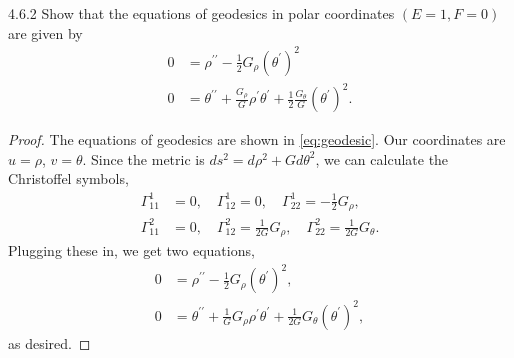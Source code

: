 \documentclass[11pt]{article}
\begin{document}
\begin{problem}{4.6.2}
  Show that the equations of geodesics in polar coordinates \( (E=1, F = 0) \) are given by
  \begin{equation}
  \label{eq:5}
  \begin{aligned}
    0 &= \rho^{\prime\prime} - \frac{1}{2}G_{\rho}(\theta^{\prime})^2 \\
    0 &= \theta^{\prime\prime} + \frac{G_{\rho}}{G}\rho^{\prime}\theta^{\prime} + \frac{1}{2} \frac{G_{\theta}}{G}(\theta^{\prime})^2.
  \end{aligned}
  \end{equation}
\end{problem}
\begin{proof}
  The equations of geodesics are shown in \cref{eq:geodesic}.
  Our coordinates are \( u = \rho \), \( v = \theta \).
  Since the metric is \( ds^2 = d\rho^2 + G d\theta^2 \), we can calculate the Christoffel symbols,
  \begin{equation}
  \label{eq:27}
  \begin{aligned}
    \Gamma_{11}^{1} &= 0, \quad \Gamma_{12}^1 = 0, \quad \Gamma_{22}^1 = -\frac{1}{2}G_{\rho}, \\
    \Gamma_{11}^2 &= 0, \quad \Gamma_{12}^2 = \frac{1}{2G}G_{\rho}, \quad \Gamma_{22}^2 = \frac{1}{2G}G_{\theta}.
  \end{aligned}
\end{equation}
Plugging these in, we get two equations,
\begin{equation}
\label{eq:28}
\begin{aligned}
  0 &= \rho^{\prime\prime} - \frac{1}{2}G_{\rho} (\theta^{\prime})^2, \\
  0 &= \theta^{\prime\prime} + \frac{1}{G}G_{\rho} \rho^{\prime}\theta^{\prime} + \frac{1}{2G}G_{\theta}(\theta^{\prime})^2,
\end{aligned}
\end{equation}
as desired.
\end{proof}
\end{document}

